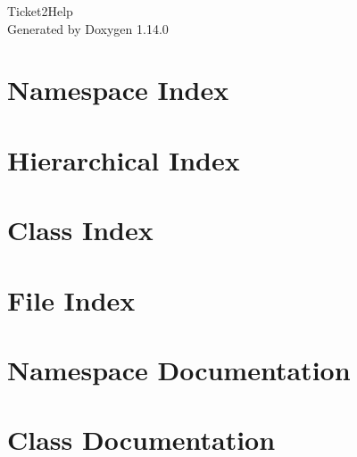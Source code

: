 \documentclass[twoside]{book}
\newcommand{\+}{\discretionary{\mbox{\scriptsize$\hookleftarrow$}}{}{}}
\newcommand{\clearemptydoublepage}{%
    \newpage{\pagestyle{empty}\cleardoublepage}%
  }
\begin{document}
  \raggedbottom
    \hypersetup{pageanchor=false,
                bookmarksnumbered=true,
                pdfencoding=unicode
               }
  \begin{titlepage}
  \vspace*{7cm}
  \begin{center}%
  {\Large Ticket2\+Help}\\
  \vspace*{1cm}
  {\large Generated by Doxygen 1.14.0}\\
  \end{center}
  \end{titlepage}
  \clearemptydoublepage
  \tableofcontents
  \clearemptydoublepage
  \hypersetup{pageanchor=true}

\chapter{Namespace Index}

\chapter{Hierarchical Index}

\chapter{Class Index}

\chapter{File Index}

\chapter{Namespace Documentation}



\chapter{Class Documentation}




















\end{document}
